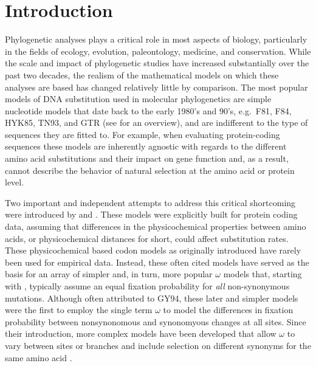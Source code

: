 \documentclass[onecolumn,letterpaper,fleqn,nogrid]{myMBE}%
\newcommand{\PC}{physicochemical\xspace}
\begin{document}

\maketitle








\section{Introduction}
Phylogenetic analyses plays a critical role in most aspects of biology, particularly in the fields of ecology, evolution, paleontology, medicine, and conservation.
While the scale and impact of phylogenetic studies have increased substantially over the past two decades, the realism of the mathematical models on which these analyses are based has changed relatively little by comparison.
The most popular models of DNA substitution used in molecular phylogenetics are simple nucleotide models that date back to the early 1980's and 90's, e.g.~F81, F84, HYK85, TN93, and GTR (see \citet{Yang2014} for an overview), and are indifferent to the type of sequences they are fitted to.
For example, when evaluating protein-coding sequences these models are inherently agnostic with regards to the different amino acid substitutions and their impact on gene function and, as a result, cannot describe the behavior of natural selection at the amino acid or protein level.

Two important and independent attempts to address this critical shortcoming were introduced by \citet[][commonly abbreviated as GY94]{GoldmanAndYang1994} and \citet{MuseAndGaut1994}.
These models were explicitly built for protein coding data, assuming that differences in the \PC properties between amino acids, or \PC distances for short, could affect substitution rates.
These \PC based codon models as originally introduced have rarely been used for empirical data.
Instead, these often cited models have served as the basis for an array of simpler and, in turn, more popular $\omega$ models that, starting with \citet{YangAndNielsen1998,NielsenAndYang1998}, typically assume an equal fixation probability for \emph{all} non-synonymous mutations.
Although often attributed to GY94, these later and  simpler models were the first to employ the single term $\omega$ to model the differences in fixation probability between nonsynonomous and synonomyous changes at all sites.
Since their introduction, more complex models have been developed that allow $\omega$ to vary between sites or branches \citep[as cited in ][]{Anisimova2012} and include selection on different synonyms for the same amino acid \cite[e.g.][]{YangAndNielsen2008}. %
\end{document}
